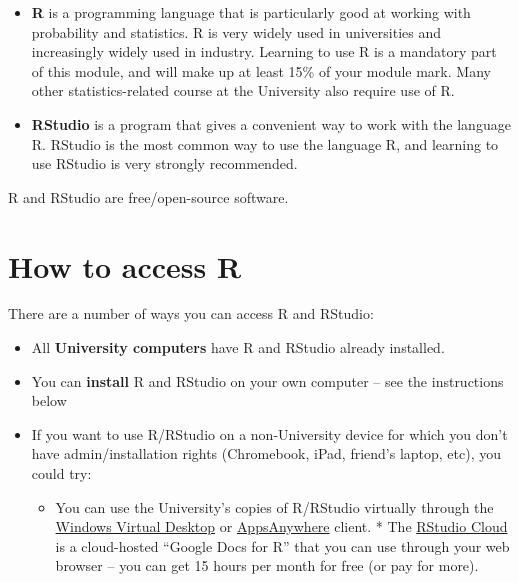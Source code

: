 \documentclass[
  a4paper,
]{book}
\providecommand{\tightlist}{%
  \setlength{\itemsep}{0pt}\setlength{\parskip}{0pt}}
\theoremstyle{definition}
\theoremstyle{definition}
\theoremstyle{definition}
\theoremstyle{remark}
\begin{document}
\begin{itemize}
\item
  \textbf{R} is a programming language that is particularly good at working with probability and statistics. R is very widely used in universities and increasingly widely used in industry. Learning to use R is a mandatory part of this module, and will make up at least 15\% of your module mark. Many other statistics-related course at the University also require use of R.
\item
  \textbf{RStudio} is a program that gives a convenient way to work with the language R. RStudio is the most common way to use the language R, and learning to use RStudio is very strongly recommended.
\end{itemize}

R and RStudio are free/open-source software.

\hypertarget{r-access}{%
\section*{How to access R}\label{r-access}}

There are a number of ways you can access R and RStudio:

\begin{itemize}
\tightlist
\item
  All \textbf{University computers} have R and RStudio already installed.
\item
  You can \textbf{install} R and RStudio on your own computer -- see the instructions below
\item
  If you want to use R/RStudio on a non-University device for which you don't have admin/installation rights (Chromebook, iPad, friend's laptop, etc), you could try:

  \begin{itemize}
  \tightlist
  \item
    You can use the University's copies of R/RStudio virtually through the \href{https://it.leeds.ac.uk/it?id=kb_article\&sysparm_article=KB0014379}{Windows Virtual Desktop} or \href{https://it.leeds.ac.uk/it?id=kb_article\&sysparm_article=KB0014827}{AppsAnywhere} client. * The \href{https://rstudio.cloud/}{RStudio Cloud} is a cloud-hosted ``Google Docs for R'' that you can use through your web browser -- you can get 15 hours per month for free (or pay for more).
  \end{itemize}
\end{itemize}
\end{document}
